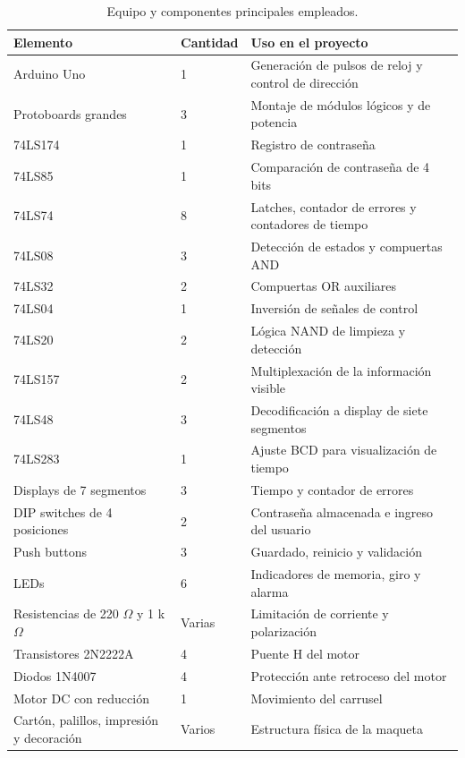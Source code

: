 \documentclass[12pt,a4paper]{article}
\begin{document}
\begin{table}[H]
    \centering
    \caption{Equipo y componentes principales empleados.}
    \small
    \begin{tabular}{p{4.5cm}p{2cm}p{7cm}}
        \toprule
        \textbf{Elemento} & \textbf{Cantidad} & \textbf{Uso en el proyecto} \\
        \midrule
        Arduino Uno & 1 & Generación de pulsos de reloj y control de dirección \\
        Protoboards grandes & 3 & Montaje de módulos lógicos y de potencia \\
        74LS174 & 1 & Registro de contraseña \\
        74LS85 & 1 & Comparación de contraseña de 4 bits \\
        74LS74 & 8 & Latches, contador de errores y contadores de tiempo \\
        74LS08 & 3 & Detección de estados y compuertas AND \\
        74LS32 & 2 & Compuertas OR auxiliares \\
        74LS04 & 1 & Inversión de señales de control \\
        74LS20 & 2 & Lógica NAND de limpieza y detección \\
        74LS157 & 2 & Multiplexación de la información visible \\
        74LS48 & 3 & Decodificación a display de siete segmentos \\
        74LS283 & 1 & Ajuste BCD para visualización de tiempo \\
        Displays de 7 segmentos & 3 & Tiempo y contador de errores \\
        DIP switches de 4 posiciones & 2 & Contraseña almacenada e ingreso del usuario \\
        Push buttons & 3 & Guardado, reinicio y validación \\
        LEDs & 6 & Indicadores de memoria, giro y alarma \\
        Resistencias de 220 $\Omega$ y 1 k$\Omega$ & Varias & Limitación de corriente y polarización \\
        Transistores 2N2222A & 4 & Puente H del motor \\
        Diodos 1N4007 & 4 & Protección ante retroceso del motor \\
        Motor DC con reducción & 1 & Movimiento del carrusel \\
        Cartón, palillos, impresión y decoración & Varios & Estructura física de la maqueta \\
        \bottomrule
    \end{tabular}
\end{table}
\end{document}

